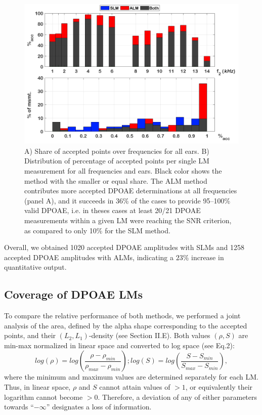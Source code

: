 \documentclass[journal,twoside,web]{ieeecolor2}
\begin{document}
\begin{figure}[ht]
\centerline{\includegraphics[width=\columnwidth]{Fig_Efficiency_v3.png}}
\caption{A) Share of accepted points over frequencies for all ears.
B) Distribution of percentage of accepted points per single LM measurement for all frequencies and ears.
Black color shows the method with the smaller or equal share. The ALM method contributes more accepted DPOAE determinations at all frequencies (panel A), and it succeeds in 36\% of the cases to provide 95–100\% valid DPOAE, i.e. in theses cases at least 20/21 DPOAE measurements within a given LM were reaching the SNR criterion, as compared to only 10\% for the SLM method.}
\label{fig_EFF}
\end{figure}

Overall, we obtained 1020 accepted DPOAE amplitudes with SLMs and 1258 accepted DPOAE amplitudes with ALMs, indicating a $23\%$ increase in quantitative output.

\subsection{Coverage of DPOAE LMs}
To compare the relative performance of both methods, we performed a joint analysis of the area, defined by the alpha shape corresponding to the accepted points, and their $(L_2, L_1)$-density (see Section II.E).
Both values $(\rho, S)$ are min-max normalized in linear space and converted to log space (see Eq.2):
\begin{equation} log(\rho) = log(\frac{\rho - \rho_{min}}{\rho_{max} - \rho_{min}}); log(S) = log(\frac{S - S_{min}}{S_{max} - S_{min}}), \label{eq2}\end{equation}
where the minimum and maximum values are determined separately for each LM.
Thus, in linear space, $\rho$ and $S$ cannot attain values of $> 1$, or equivalently their logarithm cannot become $> 0$.
Therefore, a deviation of any of either parameters towards “$-\infty$” designates a loss of information.
\end{document}
